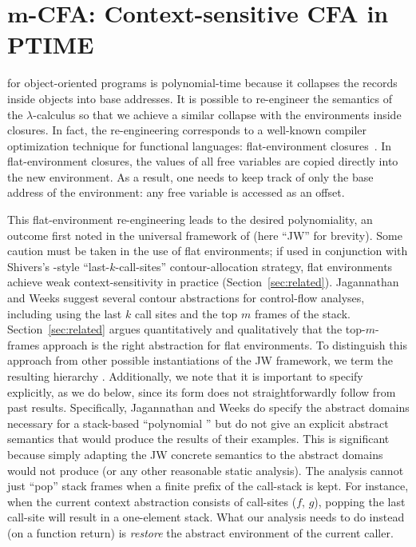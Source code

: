 \section{$\boldsymbol m$-CFA: Context-sensitive CFA in PTIME}
\label{sec:mcfa}

\kCFA{} for object-oriented programs is polynomial-time because it
collapses the records inside objects into base addresses.
It is possible to re-engineer the semantics of the $\lambda$-calculus
so that we achieve a similar collapse with the environments inside
closures.
In fact, the re-engineering corresponds to a well-known compiler
optimization technique for functional languages: flat-environment
closures~\cite{dvanhorn:Cardelli1984Compiling,dvanhorn:Appel1991Compiling}.
In flat-environment closures, the values of all free variables are
copied directly into the new environment.
As a result, one needs to keep track of only the base address of the
environment: any free variable is accessed as an offset.


This flat-environment re-engineering leads to the desired
polynomiality, an outcome first noted in the universal framework of
\citet{mattmight:Jagannathan:1995:Unified} (here ``JW'' for brevity).
Some caution must be taken in the use of flat environments; 
if used in conjunction with Shivers's \kCFA{}-style
``last-$k$-call-sites'' contour-allocation strategy, flat environments
achieve weak context-sensitivity in practice
(Section~\ref{sec:related}).
Jagannathan and Weeks
suggest several contour abstractions for control-flow analyses,
including using the last $k$ call sites and the top $m$ frames of the
stack.
Section~\ref{sec:related} argues quantitatively and qualitatively that
the top-$m$-frames approach is the right abstraction for flat environments.
To distinguish this approach from other possible instantiations of the
JW framework, we term the
resulting hierarchy \nCFA{}.
Additionally, we note that it is important to specify \nCFA{}
explicitly, as we do below, since its form does not straightforwardly
follow from past results. Specifically,
Jagannathan and Weeks
do specify the abstract
domains necessary for a stack-based ``polynomial \kCFA'' but do not give an
explicit abstract semantics that would produce the results of their
examples. This is significant because simply adapting the
JW concrete semantics to the abstract domains would not produce
\nCFA{} (or any other reasonable static analysis). The analysis cannot
just ``pop'' stack frames when a finite prefix of the call-stack is
kept. For instance, when the current context abstraction consists of
call-sites ($f$, $g$), popping the last call-site will result in a
one-element stack. What our analysis needs to do instead (on a
function return) is \emph{restore} the abstract environment of the
current caller.


